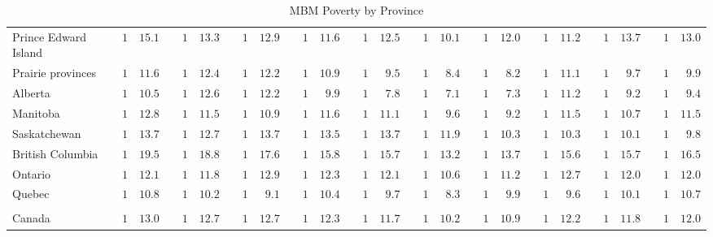 \documentclass{article}\usepackage[]{graphicx}\usepackage[]{color}
\begin{document}
\begin{table}[!tbp]
\begin{center}
\begin{tabular}{lrrcrrcrrcrrcrrcrrcrrcrrcrrcrr}
Prince Edward Island&$1$&$15.1$&&$1$&$13.3$&&$1$&$12.9$&&$1$&$11.6$&&$1$&$12.5$&&$1$&$10.1$&&$1$&$12.0$&&$1$&$11.2$&&$1$&$13.7$&&$1$&$13.0$\tabularnewline
Prairie provinces&$1$&$11.6$&&$1$&$12.4$&&$1$&$12.2$&&$1$&$10.9$&&$1$&$ 9.5$&&$1$&$ 8.4$&&$1$&$ 8.2$&&$1$&$11.1$&&$1$&$ 9.7$&&$1$&$ 9.9$\tabularnewline
Alberta&$1$&$10.5$&&$1$&$12.6$&&$1$&$12.2$&&$1$&$ 9.9$&&$1$&$ 7.8$&&$1$&$ 7.1$&&$1$&$ 7.3$&&$1$&$11.2$&&$1$&$ 9.2$&&$1$&$ 9.4$\tabularnewline
Manitoba&$1$&$12.8$&&$1$&$11.5$&&$1$&$10.9$&&$1$&$11.6$&&$1$&$11.1$&&$1$&$ 9.6$&&$1$&$ 9.2$&&$1$&$11.5$&&$1$&$10.7$&&$1$&$11.5$\tabularnewline
Saskatchewan&$1$&$13.7$&&$1$&$12.7$&&$1$&$13.7$&&$1$&$13.5$&&$1$&$13.7$&&$1$&$11.9$&&$1$&$10.3$&&$1$&$10.3$&&$1$&$10.1$&&$1$&$ 9.8$\tabularnewline
British Columbia&$1$&$19.5$&&$1$&$18.8$&&$1$&$17.6$&&$1$&$15.8$&&$1$&$15.7$&&$1$&$13.2$&&$1$&$13.7$&&$1$&$15.6$&&$1$&$15.7$&&$1$&$16.5$\tabularnewline
Ontario&$1$&$12.1$&&$1$&$11.8$&&$1$&$12.9$&&$1$&$12.3$&&$1$&$12.1$&&$1$&$10.6$&&$1$&$11.2$&&$1$&$12.7$&&$1$&$12.0$&&$1$&$12.0$\tabularnewline
Quebec&$1$&$10.8$&&$1$&$10.2$&&$1$&$ 9.1$&&$1$&$10.4$&&$1$&$ 9.7$&&$1$&$ 8.3$&&$1$&$ 9.9$&&$1$&$ 9.6$&&$1$&$10.1$&&$1$&$10.7$\tabularnewline
\hline
&&&&&&&&&&&&&&&&&&&&&&&&&&&&&\tabularnewline
Canada&$1$&$13.0$&&$1$&$12.7$&&$1$&$12.7$&&$1$&$12.3$&&$1$&$11.7$&&$1$&$10.2$&&$1$&$10.9$&&$1$&$12.2$&&$1$&$11.8$&&$1$&$12.0$\tabularnewline
\hline
\end{tabular}
\end{center}
\caption{MBM Poverty by Province\label{tab2c}} 
\end{table}
\end{document}
